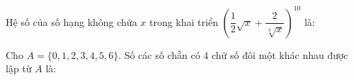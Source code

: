 \documentclass[11pt]{article}
\begin{document}
\setlength{\baselineskip}{12truept}

  \begin{multiplechoice}[title={\bf I. Các câu hỏi trắc nghiệm} , rearrange=yes, keycolumns=3]%
\begin{question}
Hệ số của số hạng không chứa $x$ trong khai triển $(\dfrac{1}{2}\sqrt x+\dfrac{2}{\sqrt[3]{x}})^{10}$ là:
\datcot
\bonpa
{}
{}
{}
{}
\end{question}
\begin{question}
Cho $A=\{ 0,1,2,3,4,5,6\}$. Số các số chẵn có 4 chữ số đôi một khác nhau được lập từ $A$ là:
\datcot
\bonpa
{}
{}
{}
{}
\end{question}

 \end{multiplechoice}
\end{document}
